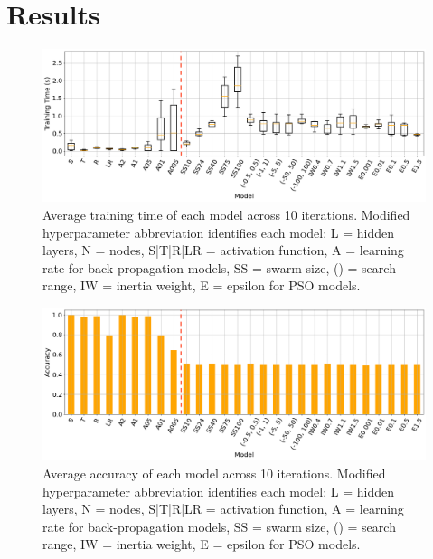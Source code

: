 \documentclass[12pt]{article}
\begin{document}
\vspace{-1.5em}
\section{Results}


\begin{figure}[H]
  \centering
  \includegraphics[width=1\textwidth]{figs/combo_ttime.png}
  \caption{
    Average training time of each model across 10 iterations.
    Modified hyperparameter abbreviation identifies each model:
    L = hidden layers, N = nodes, S|T|R|LR = activation function,
    A = learning rate for back-propagation models, SS = swarm size, () = search range, IW = inertia weight, E = epsilon for PSO models.
  }
  \label{fig:ttime}
\end{figure}

\begin{figure}[H]
  \centering
  \includegraphics[width=1\textwidth]{figs/combo_acc.png}
  \caption{
    Average accuracy of each model across 10 iterations.
    Modified hyperparameter abbreviation identifies each model:
    L = hidden layers, N = nodes, S|T|R|LR = activation function,
    A = learning rate for back-propagation models, SS = swarm size, () = search range, IW = inertia weight, E = epsilon for PSO models.
  }
  \label{fig:accuracy}
\end{figure}
\end{document}
